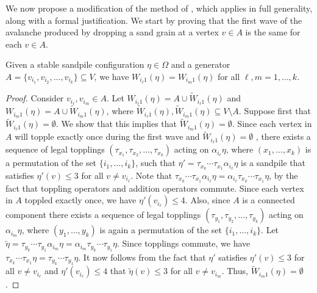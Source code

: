 \documentclass{article}
\begin{document}
We now propose a modification of the method of \citet{Dorso}, which applies in full generality, along with a formal justification. We start by proving that the first wave of the avalanche produced by dropping a sand grain at a vertex $v \in A$ is the same for each $v \in A$.
\newpage

\begin{lemma}\label{first_wave}
    Given a stable sandpile configuration $\eta \in \Omega$ and a generator $A = \{v_{i_1}, v_{i_2}, \ldots, v_{i_k}\} \subseteq V$, we have $W_{i_{\ell}1}(\eta) = W_{i_m1}(\eta)$ for all $\ell, m = 1, \ldots, k$.  
\end{lemma}
\begin{proof}
    Consider $v_{i_{\ell}}, v_{i_m} \in A$. Let $W_{i_{\ell}1}(\eta) = A \cup \tilde{W}_{i_{\ell}1}(\eta)$ and $W_{i_m1}(\eta) = A \cup \tilde{W}_{i_m1}(\eta)$, where $\tilde{W}_{i_{\ell}1}(\eta), \tilde{W}_{i_m1}(\eta) \subseteq V \setminus A$. Suppose first that $\tilde{W}_{i_{\ell}1}(\eta) = \emptyset$. We show that this implies that $\tilde{W}_{i_m1}(\eta) = \emptyset$. Since each vertex in $A$ will topple exactly once during the first wave and $\tilde{W}_{i_{\ell}1}(\eta) = \emptyset$ \citep{Ivashkevich}, there exists a sequence of legal topplings $(\tau_{x_1}, \tau_{x_2}, \ldots, \tau_{x_k})$ acting on $\alpha_{i_{\ell}}\eta$, where $(x_1, \ldots, x_k)$ is a permutation of the set $\{i_1, \ldots, i_k\}$, such that $\eta' = \tau_{x_k} \cdots \tau_{x_1} \alpha_{i_{\ell}} \eta$ is a sandpile that satisfies $\eta'(v) \leq 3$ for all $v \neq v_{i_{\ell}}$. Note that $\tau_{x_k} \cdots \tau_{x_1} \alpha_{i_{\ell}} \eta = \alpha_{i_{\ell}} \tau_{x_k} \cdots \tau_{x_1} \eta$, by the fact that toppling operators and addition operators commute. Since each vertex in $A$ toppled exactly once, we have $\eta'(v_{i_{\ell}}) \leq 4$. Also, since $A$ is a connected component there exists a sequence of legal topplings $(\tau_{y_1}, \tau_{y_2}, \ldots, \tau_{y_k})$ acting on $\alpha_{i_m} \eta$, where $(y_1, \ldots, y_k)$ is again a permutation of the set $\{i_1, \ldots, i_k\}$. Let $\tilde{\eta} = \tau_{y_k} \cdots \tau_{y_1} \alpha_{i_m} \eta = \alpha_{i_m} \tau_{y_k} \cdots \tau_{y_1} \eta$. Since topplings commute, we have $\tau_{x_k} \cdots \tau_{x_1} \eta = \tau_{y_k} \cdots \tau_{y_1} \eta$. It now follows from the fact that $\eta'$ satisfies $\eta'(v) \leq 3$ for all $v \neq v_{i_{\ell}}$ and $\eta'(v_{i_{\ell}}) \leq 4$ that $\tilde{\eta}(v) \leq 3$ for all $v \neq v_{i_m}$. Thus, $\tilde{W}_{i_m1}(\eta) = \emptyset$. 


\end{proof}
\end{document}
